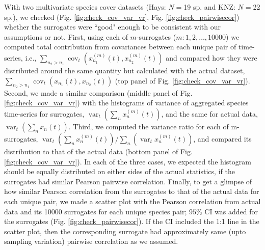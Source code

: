 \documentclass[letterpaper,11pt]{article}
\newcommand{\var}{\operatorname{var}}
\newcommand{\cov}{\operatorname{cov}}
\begin{document}



With two multivariate species cover datasets (Hays: $N=$19 sp. and KNZ: $N=$22 sp.), we checked 
(Fig. \ref{fig:check_cov_var_vr}, Fig. \ref{fig:check_pairwisecor}) whether the 
surrogates were ``good" enough to be consistent with our assumptions or not. First, using 
each of $m$-surrogates (${m : 1, 2, \ldots, 10000}$) we computed total contribution from
covariances between each unique pair of time-series, i.e., $\sum_{n_2>n_1} \cov_t(x_{n_1}^{(m)}(t),x_{n_2}^{(m)}(t))$ 
and compared how they were distributed around the same quantity but calculated with the 
actual dataset, $\sum_{n_2>n_1} \cov_t(x_{n_1}(t),x_{n_2}(t))$ (top panel 
of Fig. \ref{fig:check_cov_var_vr}). Second, we made a similar 
comparison (middle panel of Fig. \ref{fig:check_cov_var_vr}) with the histograms 
of variance of aggregated species time-series 
for surrogates, $\var_t(\sum_n x_n^{(m)}(t))$, and the same for 
actual data, $\var_t(\sum_n x_n(t))$. Third, we computed the variance ratio
for each of m-surrogates, $\var_t(\sum_n x_n^{(m)}(t))/ \sum_n(\var_t x_n^{(m)}(t))$,
and compared its distribution to that of the actual data (bottom panel 
of Fig. \ref{fig:check_cov_var_vr}). In each of the three cases, we expected 
the histogram should be equally distributed on either sides of the actual statistics, if 
the surrogates had similar Pearson pairwise correlation. Finally, to get a glimpse of how 
similar Pearson correlation from the surrogates to that of the actual data for each unique pair, 
we made a scatter plot with the Pearson correlation from actual data and its 10000 surrogates 
for each unique species pair; $95\%$ CI was added for the surrogates 
(Fig. \ref{fig:check_pairwisecor}). If the CI included the 1:1 line in the scatter plot,
then the corresponding surrogate had approximately same (upto sampling variation) pairwise correlation as we assumed.
\end{document}
